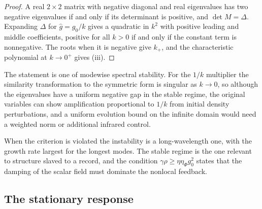 \documentclass[11pt]{article}
\theoremstyle{definition}
\theoremstyle{remark}
\begin{document}
\begin{proof}
A real $2\times2$ matrix with negative diagonal and real eigenvalues has two negative eigenvalues if and only if its determinant is positive, and $\det M=\Delta$. Expanding $\Delta$ for $\hat g=g_0/k$ gives a quadratic in $k^2$ with positive leading and middle coefficients, positive for all $k>0$ if and only if the constant term is nonnegative. The roots when it is negative give $k_+$, and the characteristic polynomial at $k\to0^+$ gives (iii).
\end{proof}

The statement is one of modewise spectral stability. For the $1/k$ multiplier the similarity transformation to the symmetric form is singular as $k\to0$, so although the eigenvalues have a uniform negative gap in the stable regime, the original variables can show amplification proportional to $1/k$ from initial density perturbations, and a uniform evolution bound on the infinite domain would need a weighted norm or additional infrared control.

When the criterion is violated the instability is a long-wavelength one, with the growth rate largest for the longest modes. The stable regime is the one relevant to structure slaved to a record, and the condition $\gamma\rho\ge\eta\eta_\Phi g_0^2$ states that the damping of the scalar field must dominate the nonlocal feedback.

\subsection{The stationary response}
\end{document}
